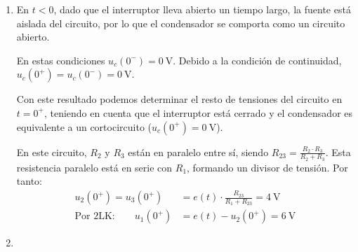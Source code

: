 \begin{enumerate}
\item

  En $t < 0$, dado que el interruptor lleva abierto un tiempo largo, la fuente
  está aislada del circuito, por lo que el condensador se comporta como un circuito
  abierto.

  \vspace{3mm}
  En estas condiciones
  $u_c(0^-) = \qty{0}{\volt}$. Debido a la condición de
  continuidad, $u_c(0^+) = u_c(0^-) = \qty{0}{\volt}$.

\begin{minipage}{0.4\linewidth}
  Con este resultado podemos determinar el resto de tensiones del
  circuito en $t = 0^+$, teniendo en cuenta que el
  interruptor está cerrado y el condensador es equivalente a un
  cortocircuito ($u_c(0^+) = \qty{0}{\volt}$).
\end{minipage}
\hfill
\begin{minipage}{0.55\linewidth}
\end{minipage}

En este circuito, $R_2$ y $R_3$ están en paralelo entre sí, siendo
$R_{23} = \frac{R_2 \cdot R_3}{R_2 + R_3}$. Esta resistencia paralelo
está en serie con $R_1$, formando un divisor de tensión. Por tanto:
\begin{align*}
  u_2(0^+) = u_3(0^+) &= e(t) \cdot \frac{R_{23}}{R_1 + R_{23}} = \qty{4}{\volt}\\
  \textrm{Por 2LK:}\qquad u_1(0^+) &= e(t) - u_2(0^+) = \qty{6}{\volt}
\end{align*}

\item


\end{enumerate}
